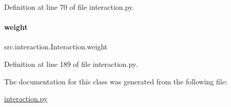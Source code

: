 Definition at line 70 of file interaction.\+py.

\mbox{\label{classsrc_1_1interaction_1_1Interaction_abd8c04a4e99808c9d5eb728e9a56debe}} 
\paragraph{\texorpdfstring{weight}{weight}}
{\footnotesize\ttfamily src.\+interaction.\+Interaction.\+weight}



Definition at line 189 of file interaction.\+py.



The documentation for this class was generated from the following file\+:\begin{DoxyCompactItemize}
\item 
\hyperlink{interaction_8py}{interaction.\+py}\end{DoxyCompactItemize}
